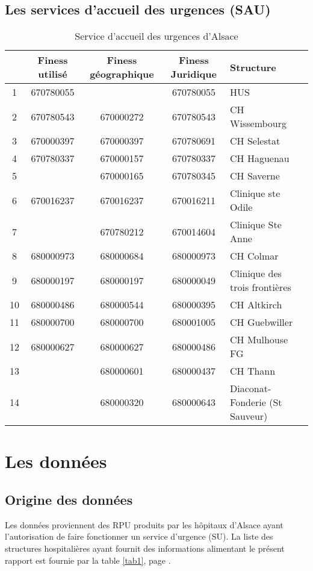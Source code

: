 \documentclass[12pt,english,french]{report}
\begin{document}
\section{Les services d'accueil des urgences (SAU)}

\begin{table}
\begin{center}
\begin{tabular}{|c|c|c|c|l|}
  \hline
& Finess utilisé & Finess géographique & Finess Juridique & Structure \\
  \hline
  \hline
1 & 670780055 &   & 670780055 & HUS \\
2 & 670780543 & 670000272 & 670780543 & CH Wissembourg \\
3 & 670000397 & 670000397  & 670780691 & CH Selestat \\
4 & 670780337 & 670000157 & 670780337 & CH Haguenau \\
5 &   & 670000165 & 670780345 & CH Saverne \\
6 & 670016237  & 670016237  & 670016211 & Clinique ste Odile \\
7 &   & 670780212 & 670014604 & Clinique Ste Anne \\
8 & 680000973 & 680000684 & 680000973 & CH Colmar \\
9 & 680000197  & 680000197  & 680000049 & Clinique des trois frontières \\
10 & 680000486 & 680000544  & 680000395 & CH Altkirch \\
11 & 680000700 & 680000700 & 680001005 & CH Guebwiller \\
12 & 680000627 & 680000627 & 680000486 & CH Mulhouse FG \\
13 &   & 680000601 & 680000437 & CH Thann \\
14 &   & 680000320  & 680000643 & Diaconat-Fonderie (St Sauveur) \\
\hline
\end{tabular}
\caption{Service d'accueil des urgences d'Alsace}
\label{summary}
\end{center}
\end{table}

%
%
\chapter{Les données}

\section{Origine des données}


Les données proviennent des RPU produits par les hôpitaux d'Alsace ayant l'autorisation de faire fonctionner un service d'urgence (SU). La liste des structures hospitalières ayant fournit des informations alimentant le présent rapport est fournie par la table \ref{tab1}, page \pageref{tab1}.
\end{document}
